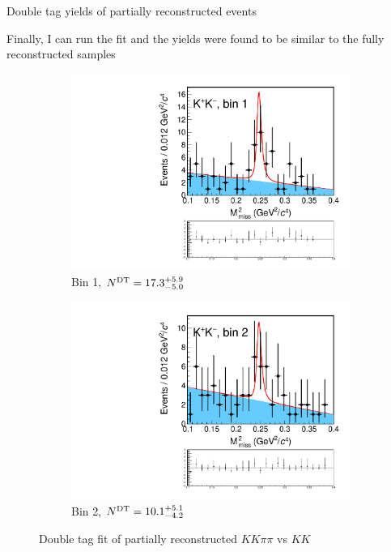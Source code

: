 \documentclass{beamer}
\begin{document}
\begin{frame}{Double tag yields of partially reconstructed events}
  \begin{center}
    Finally, I can run the fit and the yields were found to be similar to the fully reconstructed samples
  \end{center}
  \begin{figure}
    \centering
    \begin{subfigure}{0.4\textwidth}
      \includegraphics[width = 1.0\textwidth,trim={0 5cm 0 0},clip=true]{Plots/DoubleTagYield_DoubleTag_CP_KKpipi_vs_KKPartReco_SignalBin1.pdf}
      \caption{Bin 1, $N^{\rm DT} = 17.3^{+5.9}_{-5.0}$}
    \end{subfigure}%
    \begin{subfigure}{0.4\textwidth}
      \includegraphics[width = 1.0\textwidth,trim={0 5cm 0 0},clip=true]{Plots/DoubleTagYield_DoubleTag_CP_KKpipi_vs_KKPartReco_SignalBin2.pdf}
      \caption{Bin 2, $N^{\rm DT} = 10.1^{+5.1}_{-4.2}$}
    \end{subfigure}
    \caption{Double tag fit of partially reconstructed $KK\pi\pi$ vs $KK$}
  \end{figure}
\end{frame}
\end{document}
